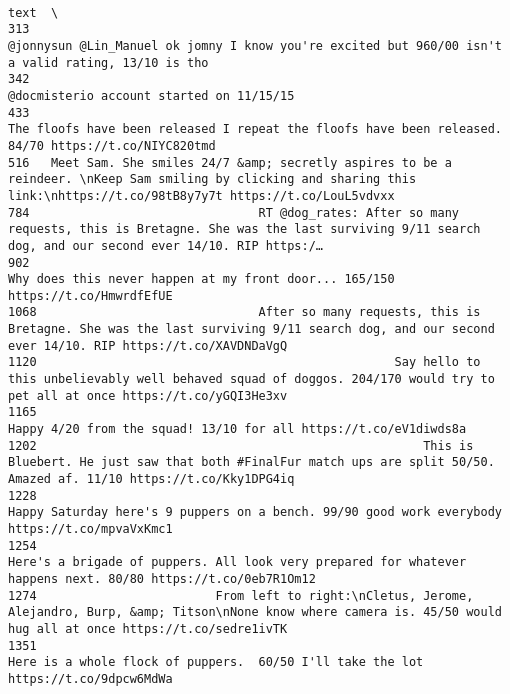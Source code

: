 \documentclass[11pt]{article}
\begin{document}
\begin{verbatim}
                                                                                                                                                                           text  \
313                                                                          @jonnysun @Lin_Manuel ok jomny I know you're excited but 960/00 isn't a valid rating, 13/10 is tho   
342                                                                                                                                    @docmisterio account started on 11/15/15   
433                                                                         The floofs have been released I repeat the floofs have been released. 84/70 https://t.co/NIYC820tmd   
516   Meet Sam. She smiles 24/7 &amp; secretly aspires to be a reindeer. \nKeep Sam smiling by clicking and sharing this link:\nhttps://t.co/98tB8y7y7t https://t.co/LouL5vdvxx   
784                                RT @dog_rates: After so many requests, this is Bretagne. She was the last surviving 9/11 search dog, and our second ever 14/10. RIP https:/…   
902                                                                                              Why does this never happen at my front door... 165/150 https://t.co/HmwrdfEfUE   
1068                               After so many requests, this is Bretagne. She was the last surviving 9/11 search dog, and our second ever 14/10. RIP https://t.co/XAVDNDaVgQ   
1120                                                  Say hello to this unbelievably well behaved squad of doggos. 204/170 would try to pet all at once https://t.co/yGQI3He3xv   
1165                                                                                                           Happy 4/20 from the squad! 13/10 for all https://t.co/eV1diwds8a   
1202                                                      This is Bluebert. He just saw that both #FinalFur match ups are split 50/50. Amazed af. 11/10 https://t.co/Kky1DPG4iq   
1228                                                                              Happy Saturday here's 9 puppers on a bench. 99/90 good work everybody https://t.co/mpvaVxKmc1   
1254                                                               Here's a brigade of puppers. All look very prepared for whatever happens next. 80/80 https://t.co/0eb7R1Om12   
1274                         From left to right:\nCletus, Jerome, Alejandro, Burp, &amp; Titson\nNone know where camera is. 45/50 would hug all at once https://t.co/sedre1ivTK   
1351                                                                                         Here is a whole flock of puppers.  60/50 I'll take the lot https://t.co/9dpcw6MdWa   

\end{verbatim}
\end{document}
